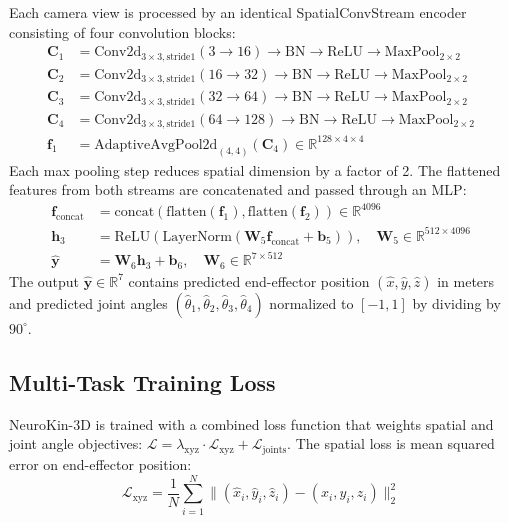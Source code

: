 \documentclass[12pt,a4paper,oneside]{report}
\begin{document}
Each camera view is processed by an identical SpatialConvStream encoder consisting of four convolution blocks:
\begin{align}
\mathbf{C}_1 &= \text{Conv2d}_{3\times3,\text{stride}1}(3 \rightarrow 16) \rightarrow \text{BN} \rightarrow \text{ReLU} \rightarrow \text{MaxPool}_{2\times2} \\
\mathbf{C}_2 &= \text{Conv2d}_{3\times3,\text{stride}1}(16 \rightarrow 32) \rightarrow \text{BN} \rightarrow \text{ReLU} \rightarrow \text{MaxPool}_{2\times2} \\
\mathbf{C}_3 &= \text{Conv2d}_{3\times3,\text{stride}1}(32 \rightarrow 64) \rightarrow \text{BN} \rightarrow \text{ReLU} \rightarrow \text{MaxPool}_{2\times2} \\
\mathbf{C}_4 &= \text{Conv2d}_{3\times3,\text{stride}1}(64 \rightarrow 128) \rightarrow \text{BN} \rightarrow \text{ReLU} \rightarrow \text{MaxPool}_{2\times2} \\
\mathbf{f}_1 &= \text{AdaptiveAvgPool2d}_{(4,4)}(\mathbf{C}_4) \in \mathbb{R}^{128 \times 4 \times 4}
\end{align}
Each max pooling step reduces spatial dimension by a factor of 2. The flattened features from both streams are concatenated and passed through an MLP:
\begin{align}
\mathbf{f}_{\text{concat}} &= \text{concat}(\text{flatten}(\mathbf{f}_1), \text{flatten}(\mathbf{f}_2)) \in \mathbb{R}^{4096} \\
\mathbf{h}_3 &= \text{ReLU}(\text{LayerNorm}(\mathbf{W}_5 \mathbf{f}_{\text{concat}} + \mathbf{b}_5)), \quad \mathbf{W}_5 \in \mathbb{R}^{512 \times 4096} \\
\hat{\mathbf{y}} &= \mathbf{W}_6 \mathbf{h}_3 + \mathbf{b}_6, \quad \mathbf{W}_6 \in \mathbb{R}^{7 \times 512}
\end{align}
The output $\hat{\mathbf{y}} \in \mathbb{R}^7$ contains predicted end-effector position $(\hat{x}, \hat{y}, \hat{z})$ in meters and predicted joint angles $(\hat{\theta}_1, \hat{\theta}_2, \hat{\theta}_3, \hat{\theta}_4)$ normalized to $[-1, 1]$ by dividing by $90^\circ$.

\subsection{Multi-Task Training Loss}
NeuroKin-3D is trained with a combined loss function that weights spatial and joint angle objectives: $\mathcal{L} = \lambda_{\text{xyz}} \cdot \mathcal{L}_{\text{xyz}} + \mathcal{L}_{\text{joints}}$. The spatial loss is mean squared error on end-effector position:
\begin{equation}
\mathcal{L}_{\text{xyz}} = \frac{1}{N} \sum_{i=1}^{N} \|(\hat{x}_i, \hat{y}_i, \hat{z}_i) - (x_i, y_i, z_i)\|_2^2
\end{equation}
\end{document}
